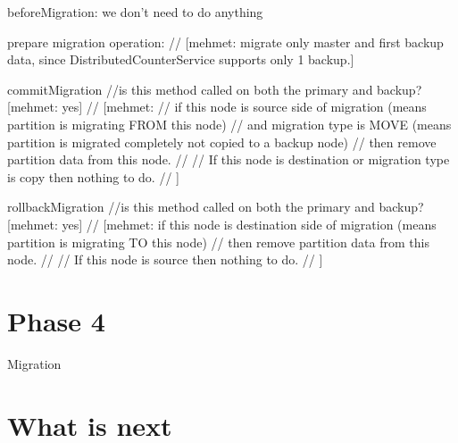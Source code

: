 beforeMigration:
we don't need to do anything

prepare migration operation:
// [mehmet: migrate only master and first backup data, since DistributedCounterService supports only 1 backup.]

commitMigration
//is this method called on both the primary and backup? [mehmet: yes]
    // [mehmet:
    // if this node is source side of migration (means partition is migrating FROM this node) 
    // and migration type is MOVE (means partition is migrated completely not copied to a backup node)
    // then remove partition data from this node.
    //
    // If this node is destination or migration type is copy then nothing to do.
    // ]

rollbackMigration
//is this method called on both the primary and backup? [mehmet: yes]
  // [mehmet: if this node is destination side of migration (means partition is migrating TO this node) 
    // then remove partition data from this node.
    // 
    // If this node is source then nothing to do.
    // ]


\section{Phase 4}
Migration

\section{What is next}